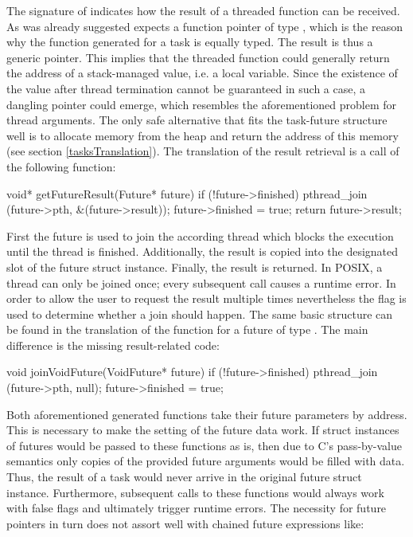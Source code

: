 The signature of  indicates how the result of a threaded function can be received. As was already suggested  expects a function pointer of type , which is the reason why the function generated for a task is equally typed. The result is thus a generic  pointer. This implies that the threaded function could generally return the address of a stack-managed value, i.e. a local variable. Since the existence of the value after thread termination cannot be guaranteed in such a case, a dangling pointer \cite{UnderstandingAndUsingCPointers} could emerge, which resembles the aforementioned problem for thread arguments. The only safe alternative that fits the task-future structure well is to allocate memory from the heap and return the address of this memory (see section \ref{tasksTranslation}). The translation of the result retrieval is a call of the following function:

\begin{ccode}
void* getFutureResult(Future* future) { 
  if (!future->finished) { 
    pthread_join (future->pth, &(future->result)); 
    future->finished = true; 
  } 
  return future->result; 
} 
\end{ccode}
First the future is used to join the according thread which blocks the execution until the thread is finished. Additionally, the result is copied into the designated slot of the future struct instance. Finally, the result is returned. In POSIX, a thread can only be joined once; every subsequent call causes a runtime error. In order to allow the user to request the result multiple times nevertheless the  flag is used to determine whether a join should happen. The same basic structure can be found in the translation of the  function for a future of type . The main difference is the missing result-related code:
\begin{ccode}
void joinVoidFuture(VoidFuture* future) { 
  if (!future->finished) { 
    pthread_join (future->pth, null); 
    future->finished = true; 
  }
}
\end{ccode}
Both aforementioned generated functions take their future parameters by address. This is necessary to make the setting of the future data work. If struct instances of futures would be passed to these functions as is, then due to C's pass-by-value semantics only copies of the provided future arguments would be filled with data. Thus, the result of a task would never arrive in the original future struct instance. Furthermore, subsequent calls to these functions would always work with false  flags and ultimately trigger runtime errors. The necessity for future pointers in turn does not assort well with chained future expressions like:


